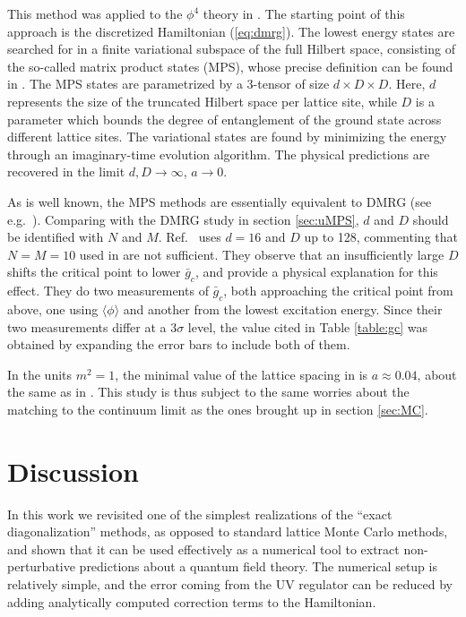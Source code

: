 \documentclass[11pt]{article}
\newcommand{\reef}[1]{(\ref{#1})}
\numberwithin{equation}{section}
\begin{document}
This method was applied to the $\phi^4$ theory in \cite{Milsted:2013rxa}. The starting point of this approach is the discretized Hamiltonian \reef{eq:dmrg}. The lowest energy states are searched for in a finite variational subspace of the full Hilbert space, consisting of the so-called matrix product states (MPS), whose precise definition can be found in \cite{Milsted:2013rxa}. The MPS states are parametrized by a 3-tensor of size $d\times D \times D$. Here, $d$ represents the size of the truncated Hilbert space per lattice site, while $D$ is a parameter which bounds the degree of entanglement of the ground state across different lattice sites. The variational states are found by minimizing the energy through an imaginary-time evolution algorithm. The physical predictions are recovered in the limit $d,D \to \infty$, $a \to 0$.

As is well known, the MPS methods are essentially equivalent to DMRG (see e.g.~\cite{Schollwock}). Comparing with the DMRG study in section \ref{sec:uMPS}, $d$ and $D$ should be identified with $N$ and $M$. Ref.~\cite{Milsted:2013rxa} uses $d=16$ and $D$ up to 128, commenting that $N=M=10$ used in \cite{Sugihara:2004qr} are not sufficient. They observe that an insufficiently large $D$ shifts the critical point to lower $\bar g_c$, and provide a physical explanation for this effect. They do two measurements of $\bar g_c$, both approaching the critical point from above, one using $\langle \phi\rangle$ and another from the lowest excitation energy. Since their two measurements differ at a $3\sigma$ level, the value cited in Table \ref{table:gc} was obtained by expanding the error bars to include both of them.

In the units $m^2=1$, the minimal value of the lattice spacing in \cite{Milsted:2013rxa} is $a\approx 0.04$, about the same as in \cite{Schaich:2009jk}. This study is thus subject to the same worries about the matching to the continuum limit as the ones brought up in section \ref{sec:MC}. 

\section{Discussion}
\label{sec:conclusions}

In this work we revisited one of the simplest realizations of the ``exact diagonalization'' methods, as opposed to standard lattice Monte Carlo methods, and shown that it can be used effectively as a numerical tool to extract non-perturbative predictions about a quantum field theory. The numerical setup is relatively simple, and the error coming from the UV regulator can be reduced by adding analytically computed correction terms to the Hamiltonian. 
\end{document}
